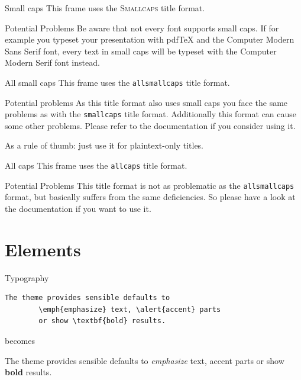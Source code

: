 \documentclass[aspectratio=169,usenames,dvipsnames,pdftex]{beamer}
\begin{document}
	{
		\begin{frame}{Small caps}
			This frame uses the \textsc{Smallcaps} title format.

			\begin{alertblock}{Potential Problems}
				Be aware that not every font supports small caps.
        If for example you typeset your presentation with pdfTeX and the Computer Modern Sans Serif font, every text in small caps will be typeset with the Computer Modern Serif font instead.
			\end{alertblock}
		\end{frame}
	}

	{
		\begin{frame}{All small caps}
			This frame uses the \texttt{allsmallcaps} title format.

			\begin{alertblock}{Potential problems}
				As this title format also uses small caps you face the same problems as with the \texttt{smallcaps} title format. Additionally this format can cause some other problems. Please refer to the documentation if you consider using it.

				As a rule of thumb: just use it for plaintext-only titles.
			\end{alertblock}
		\end{frame}
	}

	{
		\begin{frame}{All caps}
			This frame uses the \texttt{allcaps} title format.

			\begin{alertblock}{Potential Problems}
				This title format is not as problematic as the \texttt{allsmallcaps} format, but basically suffers from the same deficiencies. So please have a look at the documentation if you want to use it.
			\end{alertblock}
		\end{frame}
	}

	\section{Elements}

	\begin{frame}[fragile]{Typography}
		\begin{verbatim}The theme provides sensible defaults to
		\emph{emphasize} text, \alert{accent} parts
		or show \textbf{bold} results.\end{verbatim}

		\begin{center}becomes\end{center}

		The theme provides sensible defaults to \emph{emphasize} text,
		\alert{accent} parts or show \textbf{bold} results.
	\end{frame}
\end{document}
